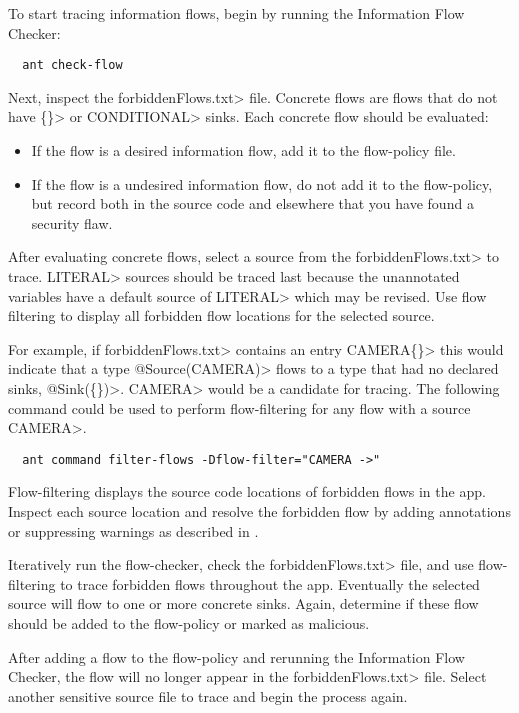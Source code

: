 To start tracing information flows, begin by running the Information Flow Checker:

\begin{Verbatim}
  ant check-flow
\end{Verbatim}

Next, inspect the \<forbiddenFlows.txt> file. Concrete flows are flows that do not have
\<\{\}> or \<CONDITIONAL> sinks. Each concrete flow should be evaluated:

\begin{itemize}
\item
If the flow is a desired information flow, add it to the flow-policy file.
\item
If the flow is a undesired information flow, do not add it to the flow-policy,
but record both in the source code and elsewhere that you have found a security flaw.
\end{itemize}

After evaluating concrete flows, select a source from the \<forbiddenFlows.txt> to trace.
\<LITERAL> sources should be traced last because the unannotated variables have
a default source of \<LITERAL> which may be revised. Use flow filtering to display
all forbidden flow locations for the selected source.

For example, if \<forbiddenFlows.txt> contains an entry \<CAMERA\flowsto \{\}>
this would indicate that a type \<@Source(CAMERA)> flows to a type that had no declared sinks,
\<@Sink(\{\})>. \<CAMERA> would be a candidate for tracing. The following command
could be used to perform flow-filtering for any flow with a source \<CAMERA>.

\begin{Verbatim}
  ant command filter-flows -Dflow-filter="CAMERA ->"
\end{Verbatim}

Flow-filtering displays the source code locations of forbidden flows in the app.
Inspect each source location and resolve the forbidden flow by adding annotations
or suppressing warnings as described in .

Iteratively run the flow-checker, check the \<forbiddenFlows.txt> file, and use flow-filtering
to trace forbidden flows throughout the app.  Eventually the selected source will flow
to one or more concrete sinks. Again, determine if these flow should be added to the flow-policy
or marked as malicious.

After adding a flow to the flow-policy and rerunning the Information Flow Checker, the flow
will no longer appear in the \<forbiddenFlows.txt> file. Select another sensitive
source file to trace and begin the process again.

